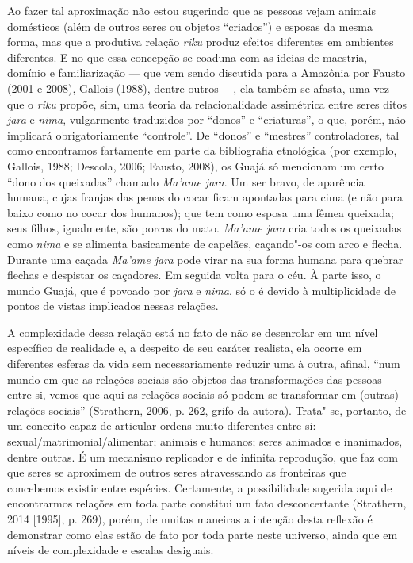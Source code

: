 Ao fazer tal aproximação não estou sugerindo que as pessoas vejam
animais domésticos (além de outros seres ou objetos ``criados'') e esposas
da mesma forma, mas que a produtiva relação \emph{riku} produz efeitos
diferentes em ambientes diferentes. E no que essa concepção se coaduna
com as ideias de maestria, domínio e familiarização --- que vem sendo
discutida para a Amazônia por Fausto (2001 e 2008), Gallois (1988),
dentre outros ---, ela também se afasta, uma vez que o \emph{riku} propõe,
sim, uma teoria da relacionalidade assimétrica entre seres ditos
\emph{jara} e \emph{nima}, vulgarmente traduzidos por ``donos'' e
``criaturas'', o que, porém, não implicará obrigatoriamente ``controle''. De
``donos'' e ``mestres'' controladores, tal como encontramos fartamente em
parte da bibliografia etnológica (por exemplo, Gallois, 1988; Descola,
2006; Fausto, 2008), os Guajá só mencionam um certo ``dono dos queixadas''
chamado \emph{Ma'ame jara}. Um ser bravo, de aparência humana, cujas
franjas das penas do cocar ficam apontadas para cima (e não para baixo
como no cocar dos humanos); que tem como esposa uma fêmea queixada; seus
filhos, igualmente, são porcos do mato. \emph{Ma'ame jara} cria todos os
queixadas como \emph{nima} e se alimenta basicamente de capelães,
caçando"-os com arco e flecha. Durante uma caçada \emph{Ma'ame jara} pode
virar na sua forma humana para quebrar flechas e despistar os caçadores.
Em seguida volta para o céu. À parte isso, o mundo Guajá, que é povoado
por \emph{jara} e \emph{nima}, só o é devido à multiplicidade de pontos
de vistas implicados nessas relações.

A complexidade dessa relação está no fato de não se desenrolar em um
nível específico de realidade e, a despeito de seu caráter realista, ela
ocorre em diferentes esferas da vida sem necessariamente reduzir uma à
outra, afinal, ``num mundo em que as relações sociais são objetos das
transformações das pessoas entre si, vemos que aqui as relações sociais
só podem se transformar em (outras) relações sociais'' (Strathern, 2006,
p. 262, grifo da autora). Trata"-se, portanto, de um conceito capaz de
articular ordens muito diferentes entre si:
sexual/matrimonial/alimentar; animais e humanos; seres animados e
inanimados, dentre outras. É um mecanismo replicador e de infinita
reprodução, que faz com que seres se aproximem de outros seres
atravessando as fronteiras que concebemos existir entre espécies.
Certamente, a possibilidade sugerida aqui de encontrarmos relações em
toda parte constitui um fato desconcertante (Strathern, 2014 [1995],
p. 269), porém, de muitas maneiras a intenção desta reflexão é demonstrar
como elas estão de fato por toda parte neste universo, ainda que em
níveis de complexidade e escalas desiguais.

